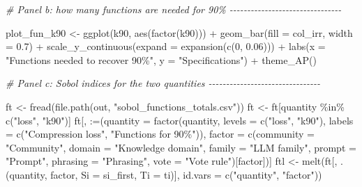 \documentclass[
  11pt,
]{article}
\newenvironment{Shaded}{\begin{snugshade}}{\end{snugshade}}
\newcommand{\AttributeTok}[1]{\textcolor[rgb]{0.77,0.63,0.00}{#1}}
\newcommand{\CommentTok}[1]{\textcolor[rgb]{0.56,0.35,0.01}{\textit{#1}}}
\newcommand{\DecValTok}[1]{\textcolor[rgb]{0.00,0.00,0.81}{#1}}
\newcommand{\FloatTok}[1]{\textcolor[rgb]{0.00,0.00,0.81}{#1}}
\newcommand{\FunctionTok}[1]{\textcolor[rgb]{0.00,0.00,0.00}{#1}}
\newcommand{\NormalTok}[1]{#1}
\newcommand{\OtherTok}[1]{\textcolor[rgb]{0.56,0.35,0.01}{#1}}
\newcommand{\SpecialCharTok}[1]{\textcolor[rgb]{0.00,0.00,0.00}{#1}}
\newcommand{\StringTok}[1]{\textcolor[rgb]{0.31,0.60,0.02}{#1}}
\begin{document}
\begin{Shaded}
\begin{Highlighting}[]
\CommentTok{\# Panel b: how many functions are needed for 90\% {-}{-}{-}{-}{-}{-}{-}{-}{-}{-}{-}{-}{-}{-}{-}{-}{-}{-}{-}{-}{-}{-}{-}{-}{-}{-}{-}{-}{-}{-}{-}{-}}

\NormalTok{plot\_fun\_k90 }\OtherTok{\textless{}{-}} \FunctionTok{ggplot}\NormalTok{(k90, }\FunctionTok{aes}\NormalTok{(}\FunctionTok{factor}\NormalTok{(k90))) }\SpecialCharTok{+}
  \FunctionTok{geom\_bar}\NormalTok{(}\AttributeTok{fill =}\NormalTok{ col\_irr, }\AttributeTok{width =} \FloatTok{0.7}\NormalTok{) }\SpecialCharTok{+}
  \FunctionTok{scale\_y\_continuous}\NormalTok{(}\AttributeTok{expand =} \FunctionTok{expansion}\NormalTok{(}\FunctionTok{c}\NormalTok{(}\DecValTok{0}\NormalTok{, }\FloatTok{0.06}\NormalTok{))) }\SpecialCharTok{+}
  \FunctionTok{labs}\NormalTok{(}\AttributeTok{x =} \StringTok{"Functions needed to recover 90\%"}\NormalTok{, }\AttributeTok{y =} \StringTok{"Specifications"}\NormalTok{) }\SpecialCharTok{+}
  \FunctionTok{theme\_AP}\NormalTok{()}

\CommentTok{\# Panel c: Sobol\textquotesingle{} indices for the two quantities {-}{-}{-}{-}{-}{-}{-}{-}{-}{-}{-}{-}{-}{-}{-}{-}{-}{-}{-}{-}{-}{-}{-}{-}{-}{-}{-}{-}{-}{-}{-}{-}}

\NormalTok{ft }\OtherTok{\textless{}{-}} \FunctionTok{fread}\NormalTok{(}\FunctionTok{file.path}\NormalTok{(out, }\StringTok{"sobol\_functions\_totals.csv"}\NormalTok{))}
\NormalTok{ft }\OtherTok{\textless{}{-}}\NormalTok{ ft[quantity }\SpecialCharTok{\%in\%} \FunctionTok{c}\NormalTok{(}\StringTok{"loss"}\NormalTok{, }\StringTok{"k90"}\NormalTok{)]}
\NormalTok{ft[, }\StringTok{\textasciigrave{}}\AttributeTok{:=}\StringTok{\textasciigrave{}}\NormalTok{(}\AttributeTok{quantity =} \FunctionTok{factor}\NormalTok{(quantity, }\AttributeTok{levels =} \FunctionTok{c}\NormalTok{(}\StringTok{"loss"}\NormalTok{, }\StringTok{"k90"}\NormalTok{),}
                            \AttributeTok{labels =} \FunctionTok{c}\NormalTok{(}\StringTok{"Compression loss"}\NormalTok{,}
                                       \StringTok{"Functions for 90\%"}\NormalTok{)),}
          \AttributeTok{factor =} \FunctionTok{c}\NormalTok{(}\AttributeTok{community =} \StringTok{"Community"}\NormalTok{, }\AttributeTok{domain =} \StringTok{"Knowledge domain"}\NormalTok{,}
                     \AttributeTok{family =} \StringTok{"LLM family"}\NormalTok{, }\AttributeTok{prompt =} \StringTok{"Prompt"}\NormalTok{,}
                     \AttributeTok{phrasing =} \StringTok{"Phrasing"}\NormalTok{, }\AttributeTok{vote =} \StringTok{"Vote rule"}\NormalTok{)[factor])]}
\NormalTok{ftl }\OtherTok{\textless{}{-}} \FunctionTok{melt}\NormalTok{(ft[, .(quantity, factor, }\AttributeTok{Si =}\NormalTok{ si\_first, }\AttributeTok{Ti =}\NormalTok{ ti)],}
            \AttributeTok{id.vars =} \FunctionTok{c}\NormalTok{(}\StringTok{"quantity"}\NormalTok{, }\StringTok{"factor"}\NormalTok{))}


\end{Highlighting}
\end{Shaded}
\end{document}
